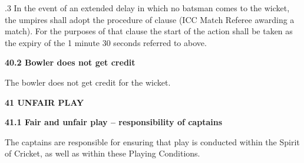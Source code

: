 \documentclass[12pt]{article}
\begin{document}
\vspace{\baselineskip}
\begin{adjustwidth}{0.5in}{0.14in}
{\fontsize{9pt}{10.8pt}.3 \tabto{0.49in} In the event of an extended delay in which no batsman comes to the wicket, the umpires shall adopt the procedure of clause (ICC Match Referee awarding a match). For the purposes of that clause the start of the action shall be taken as the expiry of the 1 minute 30 seconds referred to above.\par}\par

\end{adjustwidth}


\vspace{\baselineskip}
{\fontsize{11pt}{13.2pt}\selectfont \textbf{40.2 \tabto{0.47in} Bowler does not get credit}\par}\par


\vspace{\baselineskip}
{\fontsize{9pt}{10.8pt}\selectfont The bowler does not get credit for the wicket.\par}\par


\vspace{\baselineskip}
{\fontsize{16pt}{19.2pt}\selectfont \textbf{41 UNFAIR PLAY}\par}\par


\vspace{\baselineskip}
{\fontsize{11pt}{13.2pt}\selectfont \textbf{41.1 \tabto{0.47in} Fair and unfair play – responsibility of captains}\par}\par


\vspace{\baselineskip}
\begin{adjustwidth}{0.0in}{0.19in}
{\fontsize{9pt}{10.8pt}\selectfont The captains are responsible for ensuring that play is conducted within the Spirit of Cricket, as well as within these Playing Conditions.\par}\par

\end{adjustwidth}


\vspace{\baselineskip}

\vspace{\baselineskip}

\vspace{\baselineskip}
\end{document}
